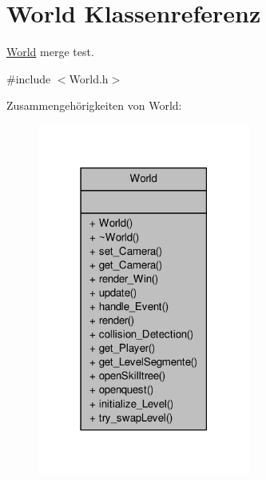 \hypertarget{class_world}{\section{World Klassenreferenz}
\label{class_world}
}


\hyperlink{class_world}{World} merge test.  




{\ttfamily \#include $<$World.\-h$>$}



Zusammengehörigkeiten von World\-:
\nopagebreak
\begin{figure}[H]
\begin{center}
\leavevmode
\includegraphics[width=198pt]{class_world__coll__graph}
\end{center}
\end{figure}
